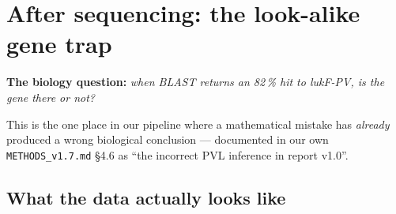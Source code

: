 \clearpage
\renewcommand{\sectioncolor}{quantum}
\section{After sequencing: the look-alike gene trap}

\noindent\textbf{\color{quantum}The biology question:} \emph{when BLAST returns an 82\,\% hit to
lukF-PV, is the gene there or not?}

\noindent This is the one place in our pipeline where a mathematical mistake has \emph{already}
produced a wrong biological conclusion --- documented in our own \texttt{METHODS\_v1.7.md} §4.6 as
``the incorrect PVL inference in report v1.0''.

\subsection{What the data actually looks like}

